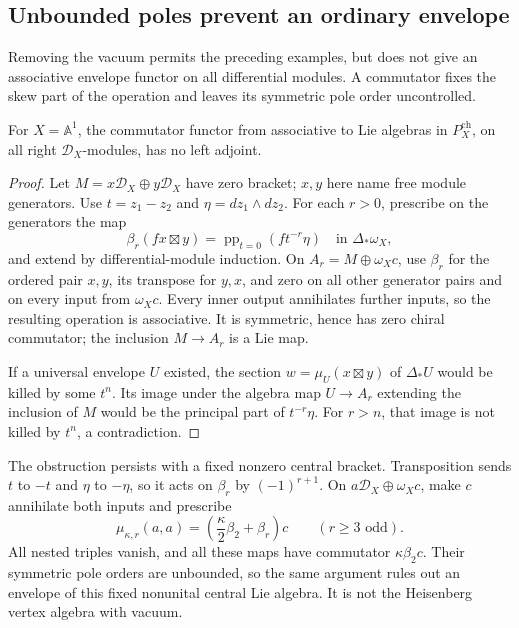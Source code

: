 \subsection{Unbounded poles prevent an ordinary envelope}

Removing the vacuum permits the preceding examples, but does
not give an associative envelope functor on all differential
modules. A commutator fixes the skew part of the operation
and leaves its symmetric pole order uncontrolled.

\begin{proposition}\label{e1f:prop:noenvelope}
For \(X=\mathbb A^1\), the commutator functor from associative
to Lie algebras in \(P_X^{\mathrm{ch}}\), on all right
\(\mathcal D_X\)-modules, has no left adjoint.
\end{proposition}

\begin{proof}
Let \(M=x\mathcal D_X\oplus y\mathcal D_X\) have zero
bracket; \(x,y\) here name free module generators.
Use\label{e1f:def:envelope-density} \(t=z_1-z_2\) and \(\eta=dz_1\wedge dz_2\).
For each \(r>0\), prescribe on the generators the map
\[
 \beta_r(fx\boxtimes y)
       =\operatorname{pp}_{t=0}(ft^{-r}\eta)
                   \quad\text{in }\Delta_*\omega_X,
\]
and extend by differential-module induction. On
\(A_r=M\oplus\omega_Xc\), use \(\beta_r\) for the ordered
pair \(x,y\), its transpose for \(y,x\), and zero on all
other generator pairs and on every input from \(\omega_Xc\).
Every inner output annihilates further inputs, so the resulting
operation is associative. It is symmetric, hence has zero
chiral commutator; the inclusion \(M\to A_r\) is a Lie map.

If a universal envelope \(U\) existed, the section
\(w=\mu_U(x\boxtimes y)\) of \(\Delta_*U\) would be
killed by some \(t^n\). Its image under the algebra map
\(U\to A_r\) extending the inclusion of \(M\) would be
the principal part of \(t^{-r}\eta\). For \(r>n\), that
image is not killed by \(t^n\), a contradiction.
\end{proof}

The\label{e1f:def:unbounded-symmetric-central-product} obstruction persists with a fixed nonzero central bracket.
Transposition sends \(t\) to \(-t\) and \(\eta\) to
\(-\eta\), so it acts on \(\beta_r\) by \((-1)^{r+1}\).
On \(a\mathcal D_X\oplus\omega_Xc\), make \(c\)
annihilate both inputs and prescribe
\[
 \mu_{\kappa,r}(a,a)=\left(\frac\kappa2\beta_2+\beta_r\right)c
                       \qquad(r\geq3\text{ odd}).
\]
All nested triples vanish, and all these maps have commutator
\(\kappa\beta_2c\). Their symmetric pole orders are unbounded,
so the same argument rules out an envelope of this fixed
nonunital central Lie algebra. It is not the Heisenberg vertex
algebra with vacuum.

